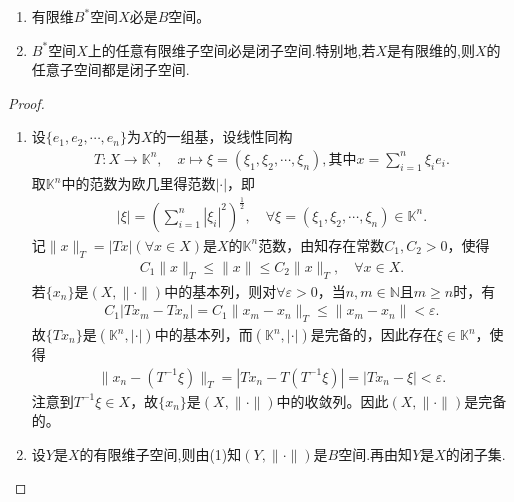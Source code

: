 \documentclass[../../main.tex]{subfiles}%
\begin{document}
\begin{corollary}\label{corollary:有限维B*空间必完备子空间必是闭的}
\begin{enumerate}[(1)]
\item 有限维$B^*$空间$X$必是$B$空间。

\item $B^*$空间$X$上的任意有限维子空间必是闭子空间.特别地,若$X$是有限维的,则$X$的任意子空间都是闭子空间.
\end{enumerate}
\end{corollary}
\begin{proof}

\begin{enumerate}[(1)]
\item 设$\{ e_1,e_2,\cdots,e_n \}$为$X$的一组基，设线性同构
\begin{align*}
T:X\rightarrow \mathbb{K} ^n,\quad x\mapsto \xi = (\xi _1,\xi _2,\cdots,\xi _n),\text{其中}x=\sum\limits_{i=1}^n \xi _ie_i.
\end{align*}
取$\mathbb{K} ^n$中的范数为欧几里得范数$|\cdot|$，即
\begin{align*}
|\xi|=\left( \sum\limits_{i=1}^n |\xi _i|^2 \right) ^{\frac{1}{2}},\quad \forall \xi = (\xi _1,\xi _2,\cdots,\xi _n) \in \mathbb{K} ^n.
\end{align*}
记$\| x \|_T=|Tx|(\forall x\in X)$是$X$的$\mathbb{K} ^n$范数，由知存在常数$C_1,C_2>0$，使得
\begin{align*}
C_1\| x \|_T\leqslant \| x \| \leqslant C_2\| x \|_T,\quad \forall x\in X.
\end{align*}
若$\{ x_n \}$是$( X,\|\cdot\| )$中的基本列，则对$\forall \varepsilon >0$，当$n,m\in \mathbb{N}$且$m\geqslant n$时，有
\begin{align*}
C_1|Tx_m-Tx_n|=C_1\| x_m-x_n \|_T\leqslant \| x_m-x_n \| <\varepsilon .
\end{align*}
故$\{ Tx_n \}$是$( \mathbb{K} ^n,|\cdot| )$中的基本列，而$( \mathbb{K} ^n,|\cdot| )$是完备的，因此存在$\xi \in \mathbb{K} ^n$，使得
\begin{align*}
\| x_n-(T^{-1}\xi) \|_T=|Tx_n-T(T^{-1}\xi)|=|Tx_n-\xi|<\varepsilon .
\end{align*}
注意到$T^{-1}\xi \in X$，故$\{ x_n \}$是$( X,\|\cdot\| )$中的收敛列。因此$( X,\|\cdot\| )$是完备的。

\item 设$Y$是$X$的有限维子空间,则由(1)知$(Y,\|\cdot \|)$是$B$空间.再由知$Y$是$X$的闭子集.
\end{enumerate}
\end{proof}
\end{document}
